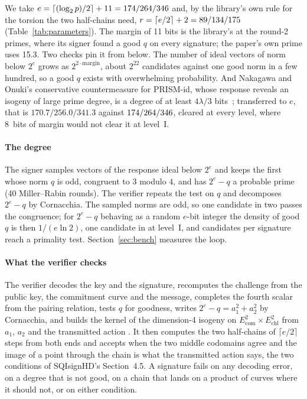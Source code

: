 \documentclass[11pt]{article}
\newcommand{\Ecom}{E_{\mathrm{com}}}
\newcommand{\Echl}{E_{\mathrm{chl}}}
\begin{document}
We take $e = \lceil (\log_2 p)/2 \rceil + 11 = 174 / 264 /
346$ and, by the library's own rule for the torsion the two
half-chains need, $r = \lceil e/2 \rceil + 2 = 89 / 134 /
175$ (Table~\ref{tab:parameters}).  The margin of 11 bits is the
library's at the round-2 primes, where its signer found a good $q$ on
every signature; the paper's own prime uses 15.3.  Two checks pin it from
below.  The number of ideal vectors of norm below $2^e$ grows as
$2^{2 \cdot \mathrm{margin}}$, about $2^{22}$ candidates against one good
norm in a few hundred, so a good $q$ exists with overwhelming probability.
And Nakagawa and Onuki's conservative countermeasure for PRISM-id, whose
response reveals an isogeny of large prime degree, is a degree of at least
$4\lambda/3$ bits~\cite[Section~5.3]{NO25}; transferred to $e$, that is
$170.7 / 256.0 / 341.3$ against $174 / 264 / 346$, cleared
at every level, where
8~bits of margin would not clear it at level~I.

\paragraph{The degree}
The signer samples vectors of the response ideal below $2^e$ and keeps the
first whose norm $q$ is odd, congruent to $3$ modulo $4$, and has $2^e -
q$ a probable prime (40 Miller--Rabin rounds).  The verifier repeats the
test on $q$ and decomposes $2^e - q$ by Cornacchia.  The sampled norms
are odd, so one candidate in two passes the congruence; for $2^e - q$
behaving as a random $e$-bit integer the density of good $q$ is then
$1/(e \ln 2)$, one candidate in \ExpectedSamplesOddI{} at level~I, and
\ExpectedTestsI{} candidates per signature reach a primality test.
Section~\ref{sec:bench} measures the loop.

\paragraph{What the verifier checks}
The verifier decodes the key and the signature, recomputes the challenge
from the public key, the commitment curve and the message, completes the
fourth scalar from the pairing relation, tests $q$ for goodness, writes
$2^e - q = a_1^2 + a_2^2$ by Cornacchia, and builds the kernel of the
dimension-4 isogeny on $\Ecom^2 \times \Echl^2$ from $a_1$, $a_2$ and the
transmitted action \cite[Lemma~4 and Section~4.4]{DLRW24}.  It then
computes the two half-chains of $\lceil e/2 \rceil$ steps from both ends
and accepts when the two middle codomains agree and the image of a point
through the chain is what the transmitted action says, the two conditions
of SQIsignHD's Section~4.5.  A signature fails on any decoding error, on a
degree that is not good, on a chain that lands on a product of curves
where it should not, or on either condition.
\end{document}
